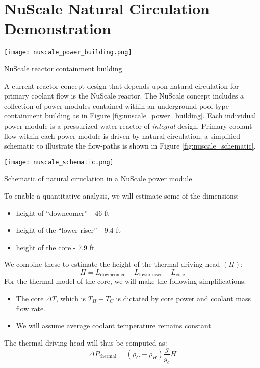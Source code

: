 \section{NuScale Natural Circulation Demonstration} 
\begin{marginfigure}
\texttt{[image: nuscale\_power\_building.png]}
\caption{NuScale reactor containment building.}
\label{fig:nuscale_power_building}
\end{marginfigure}
A current reactor concept design that depends upon natural circulation for primary coolant flow is the NuScale reactor.  The NuScale concept includes a collection of power modules contained within an underground pool-type containment building as in Figure \ref{fig:nuscale_power_building}.  Each individual power module is a pressurized water reactor of \emph{integral} design. Primary coolant flow within each power module is driven by natural circulation; a simplified schematic to illustrate the flow-paths is shown in Figure \ref{fig:nuscale_schematic}.    
\begin{marginfigure}
\texttt{[image: nuscale\_schematic.png]}
\caption{Schematic of natural ciruclation in a NuScale power module.}
\label{fig:nuscale_schematic}
\end{marginfigure}
To enable a quantitative analysis, we will estimate some of the dimensions:
\begin{itemize}
\item height of ``downcomer'' - 46 ft
\item height of the ``lower riser'' - 9.4 ft
\item height of the core - 7.9 ft
\end{itemize}
We combine these to estimate the height of the thermal driving head $(H)$:
$$H = L_{\text{downcomer}} - L_{\text{lower riser}} - L_{\text{core}}$$
For the thermal model of the core, we will make the following simplifications:
\begin{itemize}
\item The core $\Delta T$, which is $T_H - T_C$ is dictated by core power and coolant mass flow rate.
\item We will assume average coolant temperature remains constant
\end{itemize}
The thermal driving head will thus be computed as:
$$\Delta P_{\text{thermal}} = \left(\rho_C - \rho_H \right)\frac{g}{g_c} H $$
